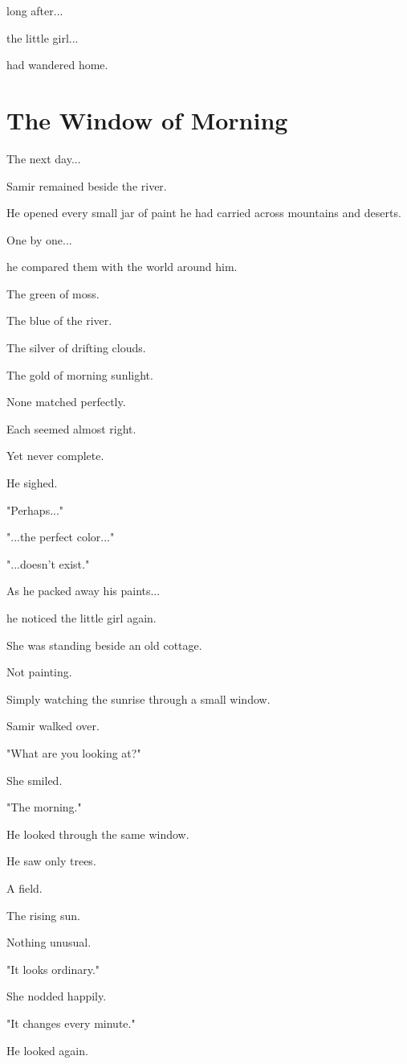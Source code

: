 \documentclass[12pt,openany]{book}
\begin{document}
long after...

the little girl...

had wandered home.
\section*{The Window of Morning}

The next day...

Samir remained beside the river.

He opened every small jar of paint he had carried across mountains and deserts.

One by one...

he compared them with the world around him.

The green of moss.

The blue of the river.

The silver of drifting clouds.

The gold of morning sunlight.

None matched perfectly.

Each seemed almost right.

Yet never complete.

He sighed.

"Perhaps..."

"...the perfect color..."

"...doesn't exist."

As he packed away his paints...

he noticed the little girl again.

She was standing beside an old cottage.

Not painting.

Simply watching the sunrise through a small window.

Samir walked over.

"What are you looking at?"

She smiled.

"The morning."

He looked through the same window.

He saw only trees.

A field.

The rising sun.

Nothing unusual.

"It looks ordinary."

She nodded happily.

"It changes every minute."

He looked again.
\end{document}

